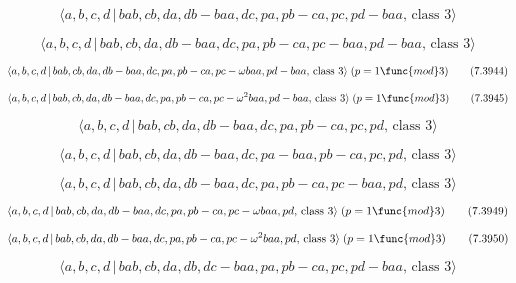 \documentclass[10pt]{article}
\begin{document}
\begin{equation}
\langle a,b,c,d\,|\,bab,cb,da,db-baa,dc,pa,pb-ca,pc,pd-baa,\,\text{class }%
3\rangle  \tag{7.3942}
\end{equation}

\begin{equation}
\langle a,b,c,d\,|\,bab,cb,da,db-baa,dc,pa,pb-ca,pc-baa,pd-baa,\,\text{class 
}3\rangle  \tag{7.3943}
\end{equation}

\begin{equation}
\langle a,b,c,d\,|\,bab,cb,da,db-baa,dc,pa,pb-ca,pc-\omega baa,pd-baa,\,%
\text{class }3\rangle \;(p=1\func{mod}3)  \tag{7.3944}
\end{equation}

\begin{equation}
\langle a,b,c,d\,|\,bab,cb,da,db-baa,dc,pa,pb-ca,pc-\omega ^{2}baa,pd-baa,\,%
\text{class }3\rangle \;(p=1\func{mod}3)  \tag{7.3945}
\end{equation}

\begin{equation}
\langle a,b,c,d\,|\,bab,cb,da,db-baa,dc,pa,pb-ca,pc,pd,\,\text{class }%
3\rangle  \tag{7.3946}
\end{equation}

\begin{equation}
\langle a,b,c,d\,|\,bab,cb,da,db-baa,dc,pa-baa,pb-ca,pc,pd,\,\text{class }%
3\rangle  \tag{7.3947}
\end{equation}

\begin{equation}
\langle a,b,c,d\,|\,bab,cb,da,db-baa,dc,pa,pb-ca,pc-baa,pd,\,\text{class }%
3\rangle  \tag{7.3948}
\end{equation}

\begin{equation}
\langle a,b,c,d\,|\,bab,cb,da,db-baa,dc,pa,pb-ca,pc-\omega baa,pd,\,\text{%
class }3\rangle \;(p=1\func{mod}3)  \tag{7.3949}
\end{equation}

\begin{equation}
\langle a,b,c,d\,|\,bab,cb,da,db-baa,dc,pa,pb-ca,pc-\omega ^{2}baa,pd,\,%
\text{class }3\rangle \;(p=1\func{mod}3)  \tag{7.3950}
\end{equation}

\begin{equation}
\langle a,b,c,d\,|\,bab,cb,da,db,dc-baa,pa,pb-ca,pc,pd-baa,\,\text{class }%
3\rangle  \tag{7.3951}
\end{equation}
\end{document}
